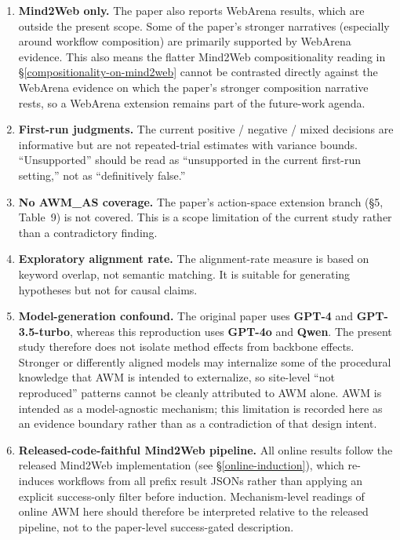 \documentclass{article}
\begin{document}
\begin{enumerate}
\def\labelenumi{\arabic{enumi}.}
\item
  \textbf{Mind2Web only.} The paper also reports WebArena results, which
  are outside the present scope. Some of the paper's stronger narratives
  (especially around workflow composition) are primarily supported by
  WebArena evidence. This also means the flatter Mind2Web
  compositionality reading in §\ref{compositionality-on-mind2web} cannot
  be contrasted directly against the WebArena evidence on which the
  paper's stronger composition narrative rests, so a WebArena extension
  remains part of the future-work agenda.
\item
  \textbf{First-run judgments.} The current positive / negative / mixed
  decisions are informative but are not repeated-trial estimates with
  variance bounds. ``Unsupported'' should be read as ``unsupported in
  the current first-run setting,'' not as ``definitively false.''
\item
  \textbf{No AWM\_AS coverage.} The paper's action-space extension
  branch (§5, Table~9) is not covered. This is a scope limitation of
  the current study rather than a contradictory finding.
\item
  \textbf{Exploratory alignment rate.} The alignment-rate measure is
  based on keyword overlap, not semantic matching. It is suitable for
  generating hypotheses but not for causal claims.
\item
  \textbf{Model-generation confound.} The original paper uses
  \textbf{GPT-4} and \textbf{GPT-3.5-turbo}, whereas this reproduction
  uses \textbf{GPT-4o} and \textbf{Qwen}. The present study therefore
  does not isolate method
  effects from backbone effects. Stronger or differently aligned
  models may internalize some of the procedural knowledge that AWM is
  intended to externalize, so site-level ``not reproduced'' patterns
  cannot be cleanly attributed to AWM alone. AWM is intended as a
  model-agnostic mechanism; this limitation is recorded here as an
  evidence boundary rather than as a contradiction of that design
  intent.
\item
  \textbf{Released-code-faithful Mind2Web pipeline.} All online results
  follow the released Mind2Web implementation (see
  §\ref{online-induction}), which re-induces workflows from all
  prefix result JSONs rather than applying an explicit success-only
  filter before induction. Mechanism-level readings of online AWM here
  should therefore be interpreted relative to the released pipeline,
  not to the paper-level success-gated description.
\end{enumerate}
\end{document}

